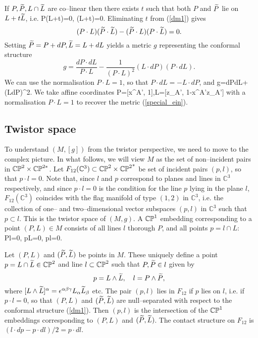 If $P,\widetilde{P},L\cap\widetilde{L}$ are co--linear then there exists $t$ such that both $P$ and $\widetilde{P}$ lie on $L+t\widetilde{L}$, i.e.
\be
\label{dm1}
P\cdot (L+t\tL)=0,  \quad
\tP\cdot (L+t\tL)=0.
\ee 
Eliminating $t$ from 
(\ref{dm1}) gives
\[
(P\cdot L)(\widetilde{P}\cdot \widetilde{L})-(\widetilde{P}\cdot L)(P\cdot \widetilde{L})=0.
\]
Setting $\widetilde{P}=P+dP, \widetilde{L}=L+dL$ yields a metric 
$g$  representing the conformal structure
\[
g=\frac{dP\cdot dL}{P\cdot L}-\frac{1}{(P\cdot L)^2}(L\cdot dP)(P\cdot dL).
\]
We can use the normalisation $P\cdot L=1$, so that $P\cdot dL=-L\cdot dP$,
and
\be
\label{dm_metric}
g={dP\cdot dL}+(L\cdot dP)^2.
\ee
We take affine coordinates 
\be
\label{DM_parameter}
P=[x^{A'}, 1],\quad L=[z_{A'}, 1-x^{A'}z_{A'}]
\ee 
with a normalisation $P\cdot L=1$ to recover the metric (\ref{special_ein}).
\koniec
\subsection{Twistor space}
\label{twist_SSS}
To understand $(M,[g])$ from the twistor perspective, we need to move to the complex picture. In what follows, we will view $M$ as the set of non--incident pairs in $\mathbb{CP}^2\times\mathbb{CP}^{2*}$.  Let $F_{12}(\mathbb{C}^3)\subset \mathbb{CP}^2\times {\mathbb{CP}^2}^*$ be set of incident pairs 
$(p, l)$, so that $p\cdot l=0$. Note that, since $l$ and $p$ correspond to planes and lines in $\mathbb{C}^3$ respectively, and since $p\cdot l=0$ is the condition for the line $p$ lying in the plane $l$, $F_{12}(\mathbb{C}^3)$ coincides with the flag manifold of type $(1,2)$ in $\mathbb{C}^3$, i.e. the collection of one-- and two--dimensional vector subspaces $(p,l)$ in $\mathbb{C}^3$ such that $p\subset l$. This is the twistor space of $(M, g)$.
A $\mathbb{CP}^1$ embedding corresponding to a point $(P, L)\in M$
consists of all lines $l$ thorough $P$, and all points
$p=l\cap L$:
\be
\label{dm2}
P\cdot l=0, \quad p\cdot L=0, \quad p\cdot l=0.
\ee

Let $(P, L)$ and $(\widetilde{P}, \widetilde{L})$ be points in $M$. These uniquely define a point $p=L\cap\widetilde{L}\in\mathbb{CP}^2$ and line $l\subset\mathbb{CP}^2$ such that $P,\widetilde{P}\in l$ given by
\[
p=L\wedge \widetilde{L}, \quad l=P\wedge \widetilde{P},
\]
where $[L\wedge\widetilde{L}]^{\alpha}=\epsilon^{\alpha\beta\gamma}L_{\alpha}\widetilde{L}_{\beta}$ etc.
The pair $(p,l)$ lies in $F_{12}$ if $p$ lies on $l$, i.e. if $p\cdot l=0$, so that $(P, L)$ and $(\widetilde{P}, \widetilde{L})$ are null--separated with respect to the conformal structure
(\ref{dm1}). Then $(p,l)$ is the intersection of the $\mathbb{CP}^1$ embeddings corresponding to $(P, L)$ and $(\widetilde{P}, \widetilde{L})$. The contact structure on $F_{12}$ is $(l\cdot dp-p\cdot dl)/2=p\cdot dl$. 

